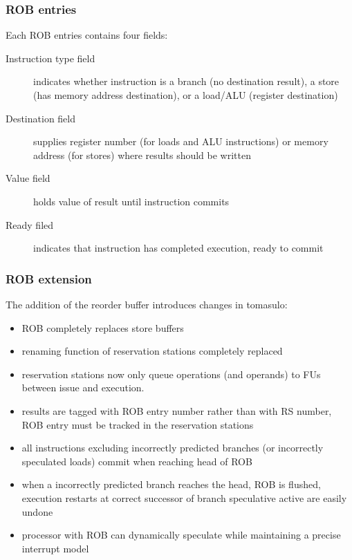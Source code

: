 \subsubsection{ROB entries}
Each ROB entries contains four fields:
\begin{description}
    \item[Instruction type field] indicates whether instruction
    is a branch (no destination result), a store (has
    memory address destination), or a load/ALU
    (register destination)
    \item[Destination field] supplies register number (for
    loads and ALU instructions) or memory address (for
    stores) where results should be written
    \item[Value field] holds value of result until
    instruction commits
    \item[Ready filed] indicates that instruction has
    completed execution, ready to commit
\end{description}

\subsubsection{ROB extension}
The addition of the reorder buffer introduces changes in tomasulo:
\begin{itemize}[noitemsep]
    \item ROB completely replaces store buffers
    \item renaming function of reservation stations completely replaced
    \item reservation stations now only queue operations (and operands) to FUs between issue and execution.
    \item results are tagged with ROB entry number rather than with RS number, ROB entry must be tracked in the
    reservation stations
    \item all instructions excluding incorrectly predicted branches (or incorrectly speculated loads) commit when
    reaching head of ROB
    \item when a incorrectly predicted branch reaches the head, ROB is flushed, execution restarts at correct
    successor of branch \textrightarrow speculative active are easily undone
    \item processor with ROB can dynamically speculate while maintaining a precise interrupt model
\end{itemize}

